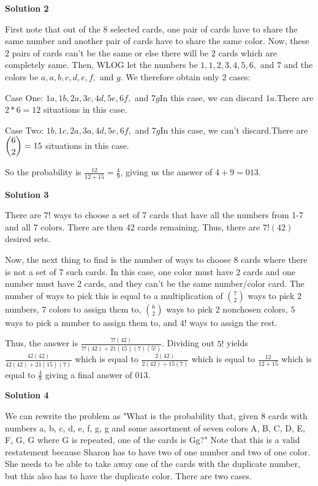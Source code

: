 \begin{enumerate}
 



\textbf{Solution 2}

First note that out of the $8$ selected cards, one pair of cards have to share the same number and another pair of cards have to share the same color. Now, these $2$ pairs of cards can't be the same or else there will be $2$ cards which are completely same. Then, WLOG let the numbers be $1,1,2,3,4,5,6,$ and $7$ and the colors be $a,a,b,c,d,e,f,$ and $g$. We therefore obtain only $2$ cases:

 Case One: $1a,1b,2a,3c,4d,5e,6f,$ and $7g$In this case, we can discard $1a$.There are $2*6=12$ situations in this case.

 Case Two: $1b,1c,2a,3a,4d,5e,6f,$ and $7g$In this case, we can't discard.There are $\dbinom{6}{2}=15$ situations in this case.

 So the probability is $\frac{12}{12+15}=\frac{4}{9}$, giving us the answer of $4+9=\boxed{013}$.

 



\textbf{Solution 3}

There are $7!$ ways to choose a set of 7 cards that have all the numbers from 1-7 and all 7 colors. There are then $42$ cards remaining. Thus, there are $7!(42)$ desired sets.

 Now, the next thing to find is the number of ways to choose 8 cards where there is not a set of 7 such cards. In this case, one color must have 2 cards and one number must have 2 cards, and they can't be the same number/color card. The number of ways to pick this is equal to a multiplication of $\binom{7}{2}$ ways to pick 2 numbers, $7$ colors to assign them to, $\binom{6}{2}$ ways to pick 2 nonchosen colors, $5$ ways to pick a number to assign them to, and $4!$ ways to assign the rest.

 Thus, the answer is $\frac{7!(42)}{7!(42) + 21(15)(7)(5!)}$. Dividing out $5!$ yields $\frac{42(42)}{42(42) + 21(15)(7)}$ which is equal to $\frac{2(42)}{2(42) + 15(7)}$ which is equal to $\frac{12}{12 + 15}$ which is equal to $\frac{4}{9}$ giving a final answer of $\boxed{013}$.

 



\textbf{Solution 4}

We can rewrite the problem as "What is the probability that, given 8 cards with numbers a, b, c, d, e, f, g, g and some assortment of seven colors A, B, C, D, E, F, G, G where G is repeated, one of the cards is Gg?" Note that this is a valid restatement because Sharon has to have two of one number and two of one color. She needs to be able to take away one of the cards with the duplicate number, but this also has to have the duplicate color. There are two cases.


\end{enumerate}
